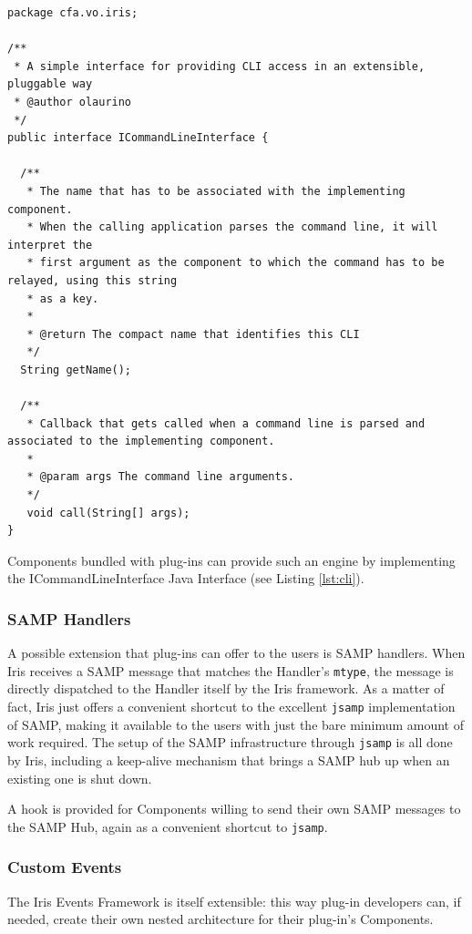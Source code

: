 \documentclass[final,5p,authoryear]{elsarticle}
\begin{document}
\begin{lstlisting}[style=java,
	caption={Every Iris component can expose a command line interface. Iris dispatches the command line arguments for the relative component to process.},
	label=lst:cli]
package cfa.vo.iris;

/**
 * A simple interface for providing CLI access in an extensible, pluggable way
 * @author olaurino
 */
public interface ICommandLineInterface {

  /**
   * The name that has to be associated with the implementing component.
   * When the calling application parses the command line, it will interpret the
   * first argument as the component to which the command has to be relayed, using this string
   * as a key.
   *
   * @return The compact name that identifies this CLI
   */
  String getName();

  /**
   * Callback that gets called when a command line is parsed and associated to the implementing component.
   *
   * @param args The command line arguments.
   */
   void call(String[] args);
}
\end{lstlisting}


Components bundled with plug-ins can provide such an engine by implementing the
ICommandLineInterface Java Interface (see Listing \ref{lst:cli}).

\subsubsection{SAMP Handlers} A possible extension that plug-ins can offer to
the users is SAMP handlers. When Iris receives a SAMP message that matches the
Handler's \verb|mtype|, the message is directly dispatched to the Handler itself
by the Iris framework. As a matter of fact, Iris just offers a convenient
shortcut to the excellent \verb|jsamp| implementation of SAMP, making it
available to the users with just the bare minimum amount of work required. The
setup of the SAMP infrastructure through \verb|jsamp| is all done by Iris,
including a keep-alive mechanism that brings a SAMP hub up when an existing one is
shut down.

A hook is provided for Components willing to send their own SAMP messages to the
SAMP Hub, again as a convenient shortcut to \verb|jsamp|.

\subsubsection{Custom Events} The Iris Events Framework is itself extensible:
this way plug-in developers can, if needed, create their own nested
architecture for their plug-in's Components.
\end{document}
